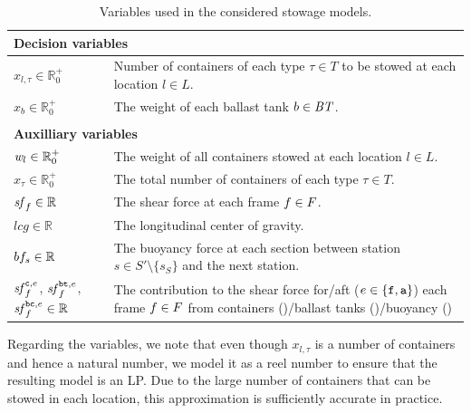 \begin{table}[p]
\centering
\begin{tabular}{p{3.5cm}p{9cm}}
\multicolumn{2}{l}{\textbf{Decision variables}}\\
\hline
$x_{l,\tau}\in \mathbb{R}^+_0$
		&Number of containers of each type $\tau\in T$ to be stowed at each location $l\in L$.\\
$x_b\in \mathbb{R}^+_0$
		& The weight of each ballast tank $b\in \mathit{BT}$.\\
\\
\multicolumn{2}{l}{\textbf{Auxilliary variables}}\\
\hline
$\mathit{w}_l\in \mathbb{R}^+_0$
		&The weight of all containers stowed at each location $l\in L$.\\
$x_\tau\in \mathbb{R}^+_0$
		&The total number of containers of each type $\tau\in T$.\\
$\mathit{sf}_f\in \mathbb{R}$
		&{The shear force at each frame $f\in F$}.\\
$lcg\in\mathbb{R}$
		&{The longitudinal center of gravity}.\\
$bf_s \in\mathbb{R}$
		&{The buoyancy force at each section between station $s\in S'\setminus\{s_S\}$ and the next station.}\\
$\mathit{sf}_f^{\texttt{c},e}$, $\mathit{sf}_f^{\texttt{bt},e}$, $\mathit{sf}_f^{\texttt{bc},e}\in\mathbb{R}$
		&The contribution to the shear force for/aft (${e}\in\{\texttt{f},\texttt{a}\}$) each frame $f\in F$ from containers (\trt{c})/ballast tanks (\trt{bt})/buoyancy (\trt{bc})
\end{tabular}
\caption{Variables used in the considered stowage models.}\label{table:vars}
\end{table}
Regarding the variables, we note that even though $x_{l,\tau}$ is a number of containers and hence a natural number, we model it as a reel number to ensure that the resulting model is an LP. Due to the large number of containers that can be stowed in each location, this approximation is sufficiently accurate in practice. 
%
